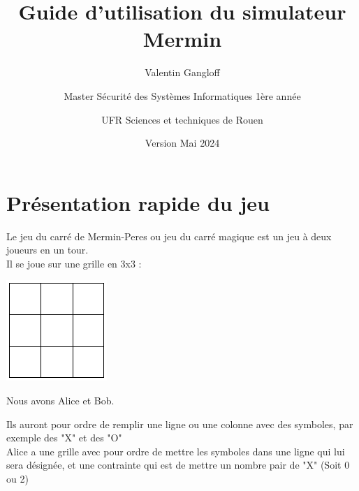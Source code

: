 \documentclass[11pt]{article}
\date{Version Mai 2024}
\author{Valentin Gangloff
\and
Master Sécurité des Systèmes Informatiques 1ère année
\and
UFR Sciences et techniques de Rouen}
\title{Guide d'utilisation du simulateur Mermin}
\begin{document}
\maketitle

\newpage 

\tableofcontents

\newpage

\section{Présentation rapide du jeu}

Le jeu du carré de Mermin-Peres ou jeu du carré magique est un jeu à deux joueurs en un tour.
\\
Il se joue sur une grille en 3x3 :

\includegraphics[width=\textwidth]{grid.png}


\newpage 

\noindent Nous avons Alice et Bob.

\noindent Ils auront pour ordre de remplir une ligne ou une colonne avec des symboles, par exemple des "X" et des "O"
\\

\noindent Alice a une grille avec pour ordre de mettre les symboles dans une ligne qui lui sera désignée, et une contrainte qui est de mettre un nombre pair de "X" (Soit 0 ou 2)
\\
\end{document}
